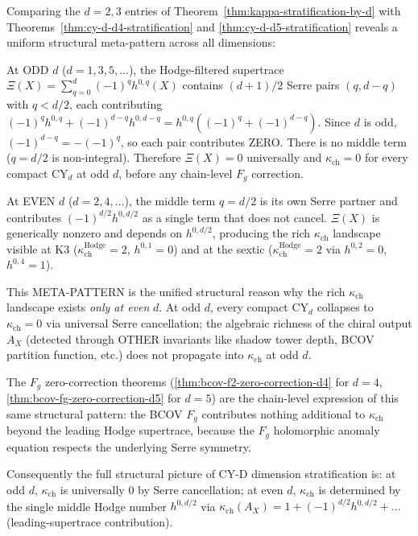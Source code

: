 \begin{remark}
\label{rem:cy-d-even-odd-meta-pattern}
Comparing the $d = 2, 3$ entries of
Theorem~\ref{thm:kappa-stratification-by-d} with
Theorems~\ref{thm:cy-d-d4-stratification} and
\ref{thm:cy-d-d5-stratification} reveals a uniform structural
meta-pattern across all dimensions:

At ODD $d$ ($d = 1, 3, 5, \ldots$), the Hodge-filtered supertrace
$\Xi(X) = \sum_{q=0}^{d}(-1)^q h^{0,q}(X)$ contains $(d+1)/2$ Serre pairs
$(q, d-q)$ with $q < d/2$, each contributing
$(-1)^q h^{0,q} + (-1)^{d-q} h^{0,d-q} = h^{0,q} ((-1)^q + (-1)^{d-q})$.
Since $d$ is odd, $(-1)^{d-q} = -(-1)^q$, so each pair contributes ZERO.
There is no middle term ($q = d/2$ is non-integral). Therefore $\Xi(X) = 0$
universally and $\kappa_{\mathrm{ch}} = 0$ for every compact CY$_d$ at odd
$d$, before any chain-level $F_g$ correction.

At EVEN $d$ ($d = 2, 4, \ldots$), the middle term $q = d/2$ is its own
Serre partner and contributes $(-1)^{d/2} h^{0, d/2}$ as a single term
that does not cancel. $\Xi(X)$ is generically nonzero and depends on
$h^{0, d/2}$, producing the rich $\kappa_{\mathrm{ch}}$ landscape
visible at K3 ($\kappa_{\mathrm{ch}}^{\mathrm{Hodge}} = 2$, $h^{0,1} = 0$) and at the
sextic ($\kappa_{\mathrm{ch}}^{\mathrm{Hodge}} = 2$ via $h^{0,2} = 0$, $h^{0,4} = 1$).

This META-PATTERN is the unified structural reason why the rich
$\kappa_{\mathrm{ch}}$ landscape exists \emph{only at even} $d$. At odd
$d$, every compact CY$_d$ collapses to $\kappa_{\mathrm{ch}} = 0$ via
universal Serre cancellation; the algebraic richness of the chiral output
$A_X$ \textup{(}detected through OTHER invariants like shadow tower
depth, BCOV partition function, etc.\textup{)} does not propagate into
$\kappa_{\mathrm{ch}}$ at odd $d$.

The $F_g$ zero-correction theorems
\textup{(}\ref{thm:bcov-f2-zero-correction-d4} for $d = 4$,
\ref{thm:bcov-fg-zero-correction-d5} for $d = 5$\textup{)} are the
chain-level expression of this same structural pattern: the BCOV $F_g$
contributes nothing additional to $\kappa_{\mathrm{ch}}$ beyond the
leading Hodge supertrace, because the $F_g$ holomorphic anomaly equation
respects the underlying Serre symmetry.

Consequently the full structural picture of CY-D dimension stratification
is: at odd $d$, $\kappa_{\mathrm{ch}}$ is universally $0$ by Serre
cancellation; at even $d$, $\kappa_{\mathrm{ch}}$ is determined by the
single middle Hodge number $h^{0, d/2}$ via $\kappa_{\mathrm{ch}}(A_X) =
1 + (-1)^{d/2} h^{0, d/2} + \ldots$ \textup{(}leading-supertrace
contribution\textup{).}
\end{remark}

